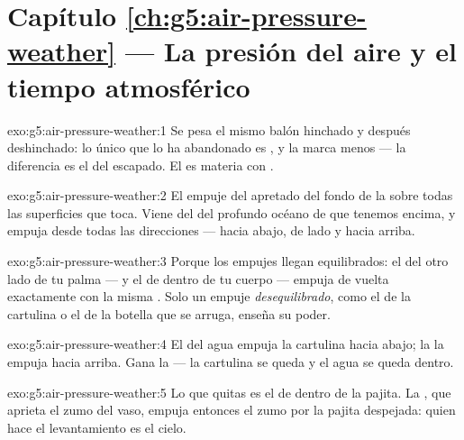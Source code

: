 \section*{Capítulo \ref{ch:g5:air-pressure-weather} --- La presión del aire y el tiempo atmosférico}

\begin{solution}{exo:g5:air-pressure-weather:1}
Se pesa el mismo balón hinchado y después deshinchado: lo único que lo
ha abandonado es , y la  marca menos --- la diferencia es
el  del  escapado. El  es materia con .
\end{solution}

\begin{solution}{exo:g5:air-pressure-weather:2}
El empuje del  apretado del fondo de la  sobre todas
las superficies que toca. Viene del  del profundo océano de
 que tenemos encima, y empuja desde todas las direcciones ---
hacia abajo, de lado y hacia arriba.
\end{solution}

\begin{solution}{exo:g5:air-pressure-weather:3}
Porque los empujes llegan equilibrados: el  del otro lado de tu
palma --- y el de dentro de tu cuerpo --- empuja de vuelta exactamente
con la misma . Solo un empuje \emph{desequilibrado}, como el de
la cartulina o el de la botella que se arruga, enseña su poder.
\end{solution}

\begin{solution}{exo:g5:air-pressure-weather:4}
El  del agua empuja la cartulina hacia abajo; la
 la empuja hacia arriba. Gana la  --- la
cartulina se queda y el agua se queda dentro.
\end{solution}

\begin{solution}{exo:g5:air-pressure-weather:5}
Lo que quitas es el \emph{} de dentro de la pajita. La
, que aprieta el zumo del vaso, empuja entonces el zumo por
la pajita despejada: quien hace el levantamiento es el cielo.
\end{solution}

